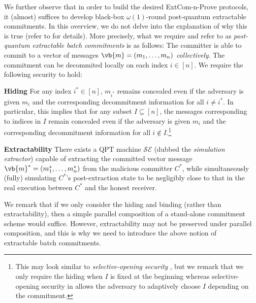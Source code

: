  We further observe that in order to build the desired ExtCom-n-Prove protocols, it (almost)  suffices to develop black-box $\omega(1)$-round post-quantum extractable commitments. In this overview, we do not delve into the explanation of why this is true (refer to  for details). %
More precisely, what we require and refer to as {\em post-quantum extractable batch commitments} is as follows: The committer is able to commit to a vector of messages $\vb{m} = (m_1, \ldots, m_n)$ {\em collectively}. The commitment can be decommited locally on each index $i\in [n]$. 
We require the following security to hold: 

\begin{description}
\item{\bf Hiding} 
For any index $i^* \in [n]$, $m_{i^*}$ remains concealed even if the adversary is given $m_i$ and the corresponding decommitment information for all $i\neq i^*$. 
In particular, this implies that for any subset $I\subseteq [n]$, the messages corresponding to indices in $I$ remain concealed even if the adversary is given $m_i$ and the corresponding decommitment information for all $i\notin I$.\footnote{This may look similar to {\em selective-opening security} \cite{JC:Hofheinz11}, but we remark that we only require the hiding when $I$ is fixed at the beginning 
whereas selective-opening security in \cite{JC:Hofheinz11} allows the adversary to adaptively choose $I$ depending on the commitment.} 

\item{\bf Extractability}
There exists a QPT machine $\mathcal{SE}$ (dubbed the {\em simulation extractor}) capable of extracting the committed vector message $\vb{m}^* = (m^*_1, \ldots, m^*_n)$ from the malicious committer $C^*$, while simultaneously (fully) simulating $C^*$'s post-extraction state to be negligibly close to that in the real execution between $C^*$ and the honest receiver. 
\end{description} 
We remark that if we only consider the hiding and binding (rather than extractability), then a simple parallel composition of a stand-alone commitment scheme would suffice. 
However, extractability may not be preserved under parallel composition, and this is why we need to introduce the above notion of extractable batch commitments. 



